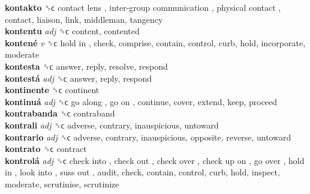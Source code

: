 \textbf{kontakto} ␝ϲ   contact lens ,  inter-group communication ,  physical contact , contact, liaison, link, middleman, tangency  \\
\textbf{kontentu} \emph{adj}  ␝ϲ  content, contented  \\
\textbf{kontené} \emph{v}  ␝ϲ   hold in , check, comprise, contain, control, curb, hold, incorporate, moderate  \\
\textbf{kontesta} ␝ϲ  answer, reply, resolve, respond  \\
\textbf{kontestá} \emph{adj}  ␝ϲ  answer, reply, respond  \\
\textbf{kontinente} ␝ϲ  continent  \\
\textbf{kontinuá} \emph{adj}  ␝ϲ   go along ,  go on , continue, cover, extend, keep, proceed  \\
\textbf{kontrabanda} ␝ϲ  contraband  \\
\textbf{kontrali} \emph{adj}  ␝ϲ  adverse, contrary, inauspicious, untoward  \\
\textbf{kontrario} \emph{adj}  ␝ϲ  adverse, contrary, inauspicious, opposite, reverse, untoward  \\
\textbf{kontrato} ␝ϲ  contract  \\
\textbf{kontrolá} \emph{adj}  ␝ϲ   check into ,  check out ,  check over ,  check up on ,  go over ,  hold in ,  look into ,  suss out , audit, check, contain, control, curb, hold, inspect, moderate, scrutinise, scrutinize  \\
